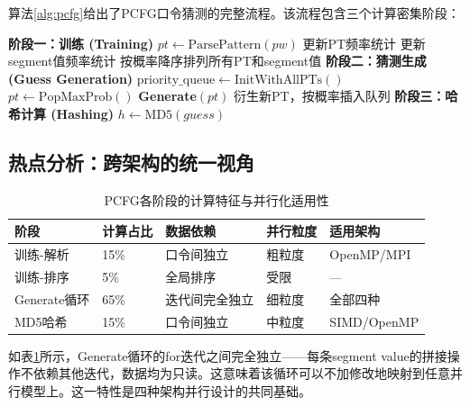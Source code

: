\documentclass[12pt,a4paper]{ctexart}
\begin{document}
算法\ref{alg:pcfg}给出了PCFG口令猜测的完整流程。该流程包含三个计算密集阶段：

\begin{algorithm}[ht]
\caption{PCFG口令猜测总流程}
\label{alg:pcfg}
\begin{algorithmic}[1]
\State \textbf{阶段一：训练 (Training)}
    \State $pt \gets \text{ParsePattern}(pw)$ 
    \State 更新PT频率统计
        \State 更新segment值频率统计
    \EndFor
\EndFor
\State 按概率降序排列所有PT和segment值
\State \textbf{阶段二：猜测生成 (Guess Generation)}
\State $\text{priority\_queue} \gets \text{InitWithAllPTs}()$
    \State $pt \gets \text{PopMaxProb}()$
    \State \textbf{Generate}$(pt)$ 
    \State 衍生新PT，按概率插入队列
\EndWhile
\State \textbf{阶段三：哈希计算 (Hashing)}
    \State $h \gets \text{MD5}(guess)$ 
\EndFor
\end{algorithmic}
\end{algorithm}

\subsection{热点分析：跨架构的统一视角}

\begin{table}[ht]
\centering
\caption{PCFG各阶段的计算特征与并行化适用性}
\label{tab:hotspot}
\begin{tabular}{@{}p{2.5cm}p{3cm}p{3cm}p{3cm}p{3cm}@{}}
\toprule
\textbf{阶段} & \textbf{计算占比} & \textbf{数据依赖} & \textbf{并行粒度} & \textbf{适用架构} \\
\midrule
训练-解析     & 15\% & 口令间独立      & 粗粒度 & OpenMP/MPI \\
训练-排序     & 5\%  & 全局排序        & 受限    & — \\
Generate循环  & 65\% & 迭代间完全独立   & 细粒度 & 全部四种 \\
MD5哈希       & 15\% & 口令间独立      & 中粒度 & SIMD/OpenMP \\
\bottomrule
\end{tabular}
\end{table}

如表\ref{tab:hotspot}所示，Generate循环的for迭代之间完全独立——每条segment value的拼接操作不依赖其他迭代，数据均为只读。这意味着该循环可以不加修改地映射到任意并行模型上。这一特性是四种架构并行设计的共同基础。
\end{document}
